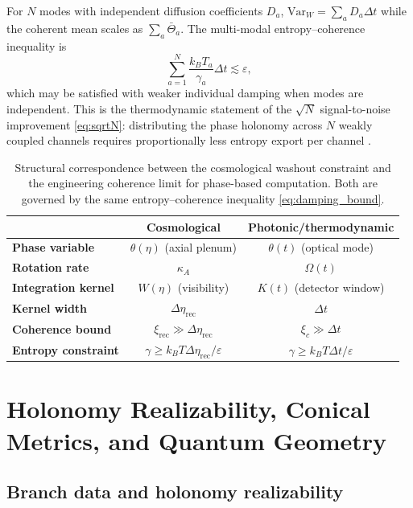 \documentclass[12pt]{article}
\theoremstyle{definition}
\newcommand{\kA}{\kappa_A}
\newcommand{\Wrec}{\Delta\eta_{\mathrm{rec}}}
\newcommand{\xirec}{\xi_{\mathrm{rec}}}
\newcommand{\VarW}{\mathrm{Var}_W}
\begin{document}
For $N$ modes with independent diffusion coefficients $D_a$,
$\VarW=\sum_aD_a\Delta t$ while the coherent mean scales as
$\sum_a\bar\Theta_a$.
The multi-modal entropy--coherence inequality is
\begin{equation}
  \sum_{a=1}^N \frac{k_BT_a}{\gamma_a}\Delta t \lesssim \varepsilon,
  \label{eq:multimodal_entropy}
\end{equation}
which may be satisfied with weaker individual damping when modes are
independent.
This is the thermodynamic statement of the $\sqrt{N}$ signal-to-noise
improvement \eqref{eq:sqrtN}: distributing the phase holonomy across $N$
weakly coupled channels requires proportionally less entropy export per
channel \cite{Proesmans2020}.

\begin{table}[h]
\centering
\small
\renewcommand{\arraystretch}{1.35}
\begin{tabular}{>{\bfseries}lcc}
  \toprule
  & Cosmological & Photonic/thermodynamic \\
  \midrule
  Phase variable & $\theta(\eta)$ (axial plenum) & $\theta(t)$ (optical mode) \\
  Rotation rate & $\kA$ & $\Omega(t)$ \\
  Integration kernel & $W(\eta)$ (visibility) & $K(t)$ (detector window) \\
  Kernel width & $\Wrec$ & $\Delta t$ \\
  Coherence bound & $\xirec\gg\Wrec$ & $\xi_c\gg\Delta t$ \\
  Entropy constraint & $\gamma\geq k_BT\Wrec/\varepsilon$ & $\gamma\geq k_BT\Delta t/\varepsilon$ \\
  \bottomrule
\end{tabular}
\caption{Structural correspondence between the cosmological washout constraint
  and the engineering coherence limit for phase-based computation.
  Both are governed by the same entropy--coherence inequality
  \eqref{eq:damping_bound}.}
\label{tab:analogy}
\end{table}

\section{Holonomy Realizability, Conical Metrics, and Quantum Geometry}
\label{sec:realizability}

\subsection{Branch data and holonomy realizability}
\end{document}
